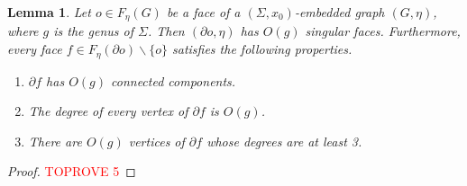 \documentclass[a4paper,11pt]{article}
\newtheorem{lemma}{Lemma}
\numberwithin{lemma}{section}
\begin{document}
\begin{lemma}\label{lem-degree}
 Let $o \in F_\eta(G)$ be a face of a $(\varSigma,x_0)$-embedded graph $(G,\eta)$, where $g$ is the genus of $\varSigma$.
 Then $(\partial o,\eta)$ has $O(g)$ singular faces.
 Furthermore, every face $f \in F_\eta(\partial o) \backslash \{o\}$ satisfies the following properties.
 \begin{enumerate}[label = (\arabic*)]
  \item\label{item:degree-1} $\partial f$ has $O(g)$ connected components.
  \item\label{item:degree-2} The degree of every vertex of $\partial f$ is $O(g)$.
  \item\label{item:degree-3} There are $O(g)$ vertices of $\partial f$ whose degrees are at least 3.
 \end{enumerate}
\end{lemma}

\begin{proof}\textcolor{red}{TOPROVE 5}\end{proof}
\end{document}
